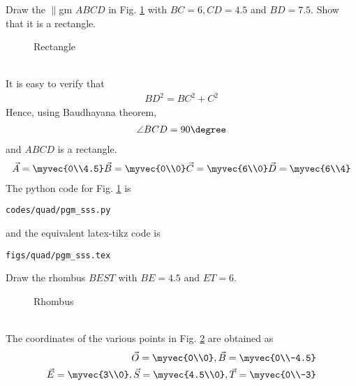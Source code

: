 \item Draw the $\parallel$gm $ABCD$ in 	Fig. \ref{fig:pgm_sss}	
with $BC = 6, CD = 4.5$ and $BD=7.5$.  Show that it is a rectangle.
\label{const:pgm_sss}
%
\begin{figure}[!ht]
	\begin{center}
		\resizebox{\columnwidth}{!}{}
	\end{center}
	\caption{Rectangle}
	\label{fig:pgm_sss}	
\end{figure}
\\
\solution It is easy to verify that 
%
\begin{align}
BD^2=BC^2+C^2
\end{align}
%
Hence, using Baudhayana theorem, 
%
\begin{align}
\angle BCD = 90\degree
\end{align}
%
and  $ABCD$ is a rectangle.
\begin{align}
\vec{A} = \myvec{0\\4.5}
\vec{B} = \myvec{0\\0}
\vec{C} = \myvec{6\\0}
\vec{D} = \myvec{6\\4}
\end{align}
%
The python code for  Fig. \ref{fig:pgm_sss} is
\begin{lstlisting}
codes/quad/pgm_sss.py
\end{lstlisting}
%
and the equivalent latex-tikz code is
%
\begin{lstlisting}
figs/quad/pgm_sss.tex
\end{lstlisting}
%
%
%
%
%
\item Draw the rhombus $BEST$ with $BE = 4.5$ and $ET = 6$. 
\begin{figure}[!ht]
	\begin{center}
		\resizebox{\columnwidth}{!}{}
	\end{center}
	\caption{Rhombus}
	\label{fig:rhom_sss}	
\end{figure}
\\
\solution The coordinates of the various points in Fig. \ref{fig:rhom_sss} are obtained as
%
\begin{align}
\vec{O} = \myvec{0\\0},
\vec{B} = \myvec{0\\-4.5}
\\
\vec{E} = \myvec{3\\0},
\vec{S} = \myvec{4.5\\0},
\vec{T} = \myvec{0\\-3}
\end{align}
